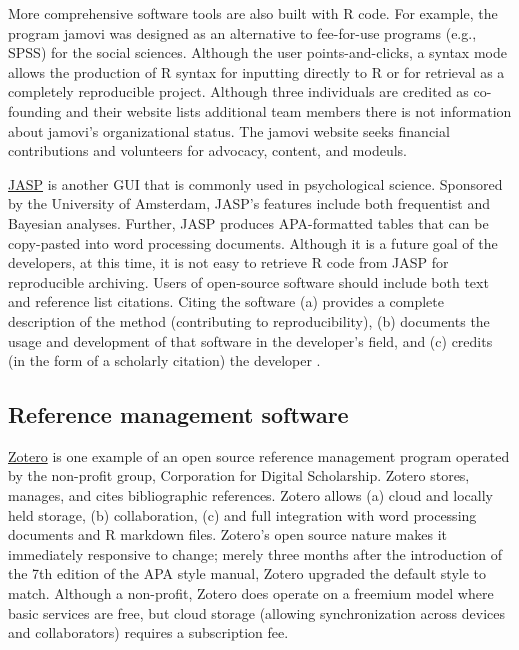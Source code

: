 \documentclass[
  11pt,
]{book}
\begin{document}
More comprehensive software tools are also built with R code. For example, the program jamovi \citep{the_jamovi_project_about_2021} was designed as an alternative to fee-for-use programs (e.g., SPSS) for the social sciences. Although the user points-and-clicks, a syntax mode allows the production of R syntax for inputting directly to R or for retrieval as a completely reproducible project. Although three individuals are credited as co-founding and their website lists additional team members \citep{the_jamovi_project_about_2021} there is not information about jamovi's organizational status. The jamovi website seeks financial contributions and volunteers for advocacy, content, and modeuls.

\href{https://jasp-stats.org/}{JASP} \citep[``just another statistics program'',][]{jasp_team_jasp_2022} is another GUI that is commonly used in psychological science. Sponsored by the University of Amsterdam, JASP's features include both frequentist and Bayesian analyses. Further, JASP produces APA-formatted tables that can be copy-pasted into word processing documents. Although it is a future goal of the developers, at this time, it is not easy to retrieve R code from JASP for reproducible archiving.
Users of open-source software should include both text and reference list citations. Citing the software (a) provides a complete description of the method (contributing to reproducibility), (b) documents the usage and development of that software in the developer's field, and (c) credits (in the form of a scholarly citation) the developer \citep{smith_software_2016}.

\hypertarget{reference-management-software}{%
\subsection{Reference management software}\label{reference-management-software}}

\href{https://www.zotero.org/}{Zotero} \citep{corporation_for_digital_scholarship_zotero_2022} is one example of an open source reference management program operated by the non-profit group, Corporation for Digital Scholarship. Zotero stores, manages, and cites bibliographic references. Zotero allows (a) cloud and locally held storage, (b) collaboration, (c) and full integration with word processing documents and R markdown files. Zotero's open source nature makes it immediately responsive to change; merely three months after the introduction of the 7th edition of the APA style manual, Zotero upgraded the default style to match. Although a non-profit, Zotero does operate on a freemium model where basic services are free, but cloud storage (allowing synchronization across devices and collaborators) requires a subscription fee.
\end{document}
